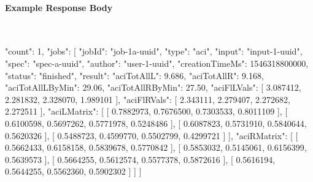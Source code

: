 \paragraph{Example Response Body} \mbox{}\\[\codeheaderspace]
\begin{jsoncode}
{
  "count": 1,
  "jobs": [
    {
      "jobId": "job-1a-uuid",
      "type": "aci",
      "input": "input-1-uuid",
      "spec": "spec-a-uuid",
      "author": "user-1-uuid",
      "creationTimeMs": 1546318800000,
      "status": "finished",
      "result": {
        "aciTotAllL": 9.686,
        "aciTotAllR": 9.168,
        "aciTotAllLByMin": 29.06,
        "aciTotAllRByMin": 27.50,
        "aciFlLVals": [
          3.087412,
          2.281832,
          2.328070,
          1.989101
        ],
        "aciFlRVals": [
          2.343111,
          2.279407,
          2.272682,
          2.272511
        ],
        "aciLMatrix": [
          [ 0.7882973, 0.7676500, 0.7303533, 0.8011109 ],
          [ 0.6100598, 0.5697262, 0.5771978, 0.5248486 ],
          [ 0.6087823, 0.5731910, 0.5840644, 0.5620326 ],
          [ 0.5488723, 0.4599770, 0.5502799, 0.4299721 ]
        ],
        "aciRMatrix": [
          [ 0.5662433, 0.6158158, 0.5839678, 0.5770842 ],
          [ 0.5853032, 0.5145061, 0.6156399, 0.5639573 ],
          [ 0.5664255, 0.5612574, 0.5577378, 0.5872616 ],
          [ 0.5616194, 0.5644255, 0.5562360, 0.5902302 ]
        ]
      }
    }
  ]
}
\end{jsoncode}
